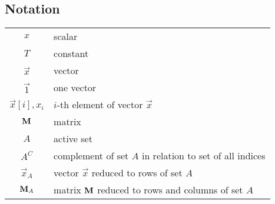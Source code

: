 \subsection*{Notation}
\begin{tabular}{c l}
$x$ & scalar\\
$T$ & constant\\
$\vec{x}$ & vector\\
$\vec{1}$ & one vector\\
$\vec{x}[i],x_i$ & $i$-th element of vector $\vec{x}$\\
$\boldsymbol{\mathrm{M}}$ & matrix\\
$A$ & active set\\
$A^C$ & complement of set $A$ in relation to set of all indices\\ 
$\vec{x}_A$ & vector $\vec{x}$ reduced to rows of set $A$ \\
$\boldsymbol{\mathrm{M}}_A$ & matrix $\boldsymbol{\mathrm{M}}$ reduced to rows and columns of set $A$ \\
\end{tabular}



